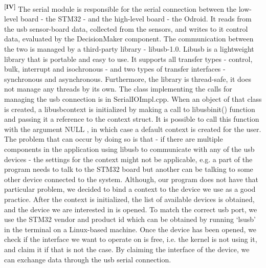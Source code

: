 \noindent
\textsuperscript{\textbf{[IV]}}
The serial module is responsible for the serial connection between the low-level
board - the STM32 - and the high-level board - the Odroid. It reads from the usb
sensor-board data, collected  from the sensors, and writes to it control data,
evaluated by the DecisionMaker component. The communication between the two is
managed by a third-party library - libusb-1.0. Libusb is a lightweight library
that is portable and easy to use. It supports all transfer types - control,
bulk, interrupt and isochronous - and two types of transfer interfaces -
synchronous and asynchronous. Furthermore, the library is thread-safe, it does
not manage any threads by its own. The class implementing the calls for managing
the usb connection is in SerialIOImpl.cpp. When an object of that class is
created, a libusb\textunderscore context is initialized by making a call to
libusb\textunderscore init() function and passing it a reference to the context
struct. It is possible to call this function with the argument NULL , in which
case a default context is created for the user. The problem that can occur by
doing so is that - if there are multiple components in the application using
libusb to communicate with any of the usb devices - the settings for the context
might not be applicable, e.g. a part of the program needs to talk to the STM32
board but another can be talking to some other device connected to the system.
Although, our program does not have that particular problem, we decided to bind
a context to the device we use as a good practice. After the context is
initialized, the list of available devices is obtained, and the device we are
interested in is opened. To match the correct usb port, we use the STM32 vendor
and product id which can be obtained by running ‘lsusb’ in the terminal on a
Linux-based machine. Once the device has been opened, we check if the interface
we want to operate on is free, i.e. the kernel is not using it, and claim it if
that is not the case. By claiming the interface of the device, we can exchange
data through the usb serial connection.\\


